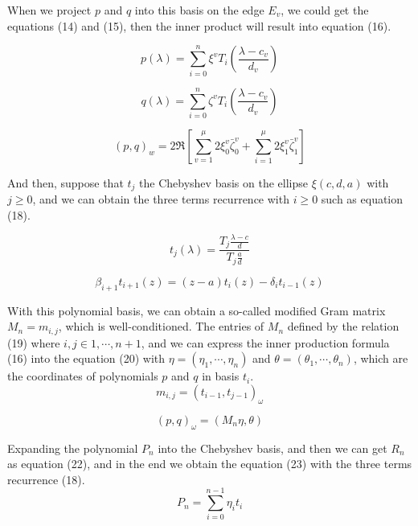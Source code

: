 When we project \(p\) and \(q\) into this basis on the edge \(E_v\), we could get the equations (14) and (15), then the inner product will result into equation (16).

\begin{equation}
p(\lambda)=\sum_{i=0}^n \xi ^v T_i(\frac{\lambda-c_v}{d_v})
\end{equation}

\begin{equation}
q(\lambda)=\sum_{i=0}^n \zeta ^v T_i(\frac{\lambda-c_v}{d_v})
\end{equation}

\begin{equation}
(p,q)_w=2\Re[\sum_{v=1}^\mu 2\xi_0^v \bar{\zeta}_0^v+\sum_{i=1}^\mu 2\xi_1^v \bar{\zeta}_1^v]
\end{equation}

And then, suppose that \(t_j\) the Chebyshev basis on the ellipse \(\xi(c,d,a)\) with \(j \geq 0\), and we can obtain the three terms recurrence with \(i \geq 0\) such as equation (18).

\begin{equation}
t_j(\lambda)=\frac{T_j \frac{\lambda-c}{d}}{T_j \frac{a}{d}}
\end{equation}

\begin{equation}
\beta_{i+1} t_{i+1}(z)=(z-a)t_i(z)-\delta_i t_{i-1}(z)
\end{equation}

With this polynomial basis, we can obtain a so-called modified Gram matrix \(M_n=m_{i,j}\), which is well-conditioned. The entries of \(M_n\) defined by the relation (19) where \(i,j \in 1,\cdots,n+1\), and we can express the inner production formula (16) into the equation (20) with \(\eta=(\eta_1,\cdots,\eta_n)\) and \(\theta=(\theta_1,\cdots,\theta_n)\), which are the coordinates of polynomials \(p\) and \(q\) in basis \(t_i\). 
\begin{equation}
m_{i,j}=(t_{i-1},t_{j-1})_\omega
\end{equation}

\begin{equation}
(p,q)_\omega=(M_n\eta, \theta)
\end{equation}

Expanding the polynomial \(P_n\) into the Chebyshev basis, and then we can get \(R_n\) as equation (22), and in the end we obtain the equation (23) with the three terms recurrence (18). 
\begin{equation}
P_n=\sum_{i=0}^{n-1}\eta_i t_i
\end{equation}

